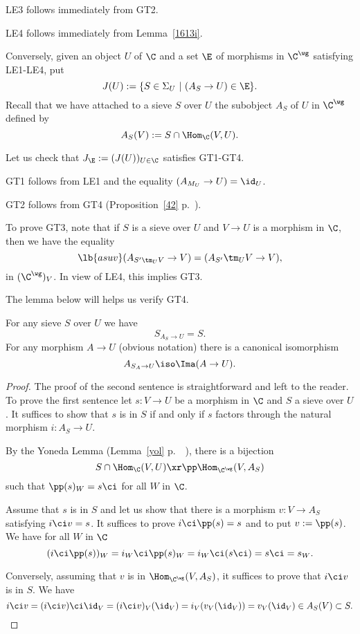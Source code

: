 \documentclass[12pt]{article}
\theoremstyle{remark}
\theoremstyle{definition}
\begin{document}
\nn LE3 follows immediately from GT2.

\nn LE4 follows immediately from Lemma~\ref{1613i}. 

Conversely, given an object $U$ of $\C$ and a set $\E$ of morphisms in $\C^\wg$ satisfying LE1-LE4, put
$$
J(U):=\{S\in\Sigma_U\ |\ (A_S\to U)\in\E\}.
$$ 
Recall that we have attached to a sieve $S$ over $U$ the subobject $A_S$ of $U$ in $\C^\wg$ defined by 
$$
A_S(V):=S\cap\Hom_\C(V,U).
$$ 

Let us check that $J_\E:=(J(U))_{U\in\C}$ satisfies GT1-GT4.

GT1 follows from LE1 and the equality $(A_{M_U}\to U)=\id_U$. 

GT2 follows from GT4 (Proposition~\ref{42} p.~\pageref{42}).

To prove GT3, note that if $S$ is a sieve over $U$ and $V\to U$ is a morphism in $\C$, then we have the equality
\begin{equation}\lb{asuv}
(A_{S'\tm_UV}\to V)=(A_{S'}\tm_UV\to V),%
\end{equation} 
in $(\C^\wg)_V$. In view of LE4, this implies GT3.

The lemma below will helps us verify GT4. 

\begin{lem}
For any sieve $S$ over $U$ we have
$$
S_{A_S\to U}=S.
$$%
For any morphism $A\to U$ (obvious notation) there is a canonical isomorphism 
$$
A_{S_A\to U}\iso\Ima(A\to U).
$$
\end{lem}

\begin{proof}
The proof of the second sentence is straightforward and left to the reader. To prove the first sentence let $s:V\to U$ be a morphism in $\C$ and $S$ a sieve over $U$. It suffices to show that $s$ is in $S$ if and only if $s$ factors through the natural morphism $i:A_S\to U$.

By the Yoneda Lemma (Lemma~\ref{yol} p.~~), there is a bijection 
$$
S\cap\Hom_\C(V,U)\xr\pp\Hom_{\C^\wg}(V,A_S)
$$
such that $\pp(s)_W=s\ci$ for all $W$ in $\C$. 

Assume that $s$ is in $S$ and let us show that there is a morphism $v:V\to A_S$ satisfying $i\ci v=s$. It suffices to prove $i\ci\pp(s)=s$ and to put $v:=\pp(s)$. We have for all $W$ in $\C$
$$
(i\ci\pp(s))_W=i_W\ci\pp(s)_W=i_W\ci(s\ci)=s\ci=s_W.
$$ 

Conversely, assuming that $v$ is in $\Hom_{\C^\wg}(V,A_S)$, it suffices to prove that $i\ci v$ is in $S$. We have 
$$
i\ci v=(i\ci v)\ci\id_V=(i\ci v)_V(\id_V)=i_V(v_V(\id_V))=v_V(\id_V)\in A_S(V)\subset S. 
$$ 
\end{proof} 
\end{document}
